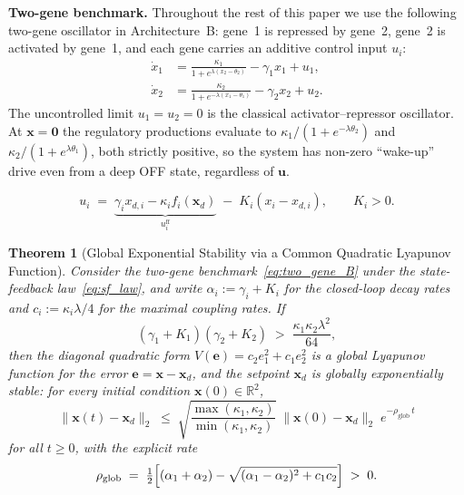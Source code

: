 \documentclass[10pt,a4paper]{amsart}
\newtheorem{theorem}{Theorem}
\begin{document}
\smallskip
\noindent\textbf{Two-gene benchmark.}\;
Throughout the rest of this paper we use the following two-gene
oscillator in Architecture~B: gene~1 is repressed by gene~2, gene~2
is activated by gene~1, and each gene carries an additive control input
$u_i$:
\begin{equation}
\boxed{
\begin{aligned}
\dot{x}_1 &= \frac{\kappa_1}{1+e^{\lambda(x_2 - \theta_2)}} - \gamma_1 x_1 + u_1,\\[2pt]
\dot{x}_2 &= \frac{\kappa_2}{1+e^{-\lambda(x_1 - \theta_1)}} - \gamma_2 x_2 + u_2.
\end{aligned}
}
\label{eq:two_gene_B}
\end{equation}
The uncontrolled limit $u_1=u_2=0$ is the classical activator--repressor
oscillator. At $\mathbf{x}=\mathbf{0}$ the regulatory productions evaluate
to $\kappa_1/(1+e^{-\lambda\theta_2})$ and $\kappa_2/(1+e^{\lambda\theta_1})$,
both strictly positive, so the system has non-zero
``wake-up'' drive even from a deep OFF state, regardless of $\mathbf{u}$.

\begin{equation}
u_i \;=\; \underbrace{\gamma_i x_{d,i} - \kappa_i f_i(\mathbf{x}_d)}_{u_i^{\mathrm{ff}}}
   \;-\; K_i (x_i - x_{d,i}),\qquad K_i>0.
\label{eq:sf_law}
\end{equation}

\begin{theorem}[Global Exponential Stability via a Common Quadratic Lyapunov Function]
\label{thm:global_sf}
Consider the two-gene benchmark~\eqref{eq:two_gene_B} under the
state-feedback law~\eqref{eq:sf_law}, and write
$\alpha_i:=\gamma_i+K_i$ for the closed-loop decay rates and
$c_i:=\kappa_i\lambda/4$ for the maximal coupling rates. If
\begin{equation}
(\gamma_1+K_1)(\gamma_2+K_2) \;>\; \frac{\kappa_1\kappa_2\lambda^2}{64},
\label{eq:global_cond}
\end{equation}
then the diagonal quadratic form $V(\mathbf{e})=c_2 e_1^2+c_1 e_2^2$ is a
global Lyapunov function for the error $\mathbf{e}=\mathbf{x}-\mathbf{x}_d$,
and the setpoint $\mathbf{x}_d$ is \emph{globally exponentially stable}:
for every initial condition $\mathbf{x}(0)\in\mathbb{R}^2$,
\begin{equation}
\|\mathbf{x}(t)-\mathbf{x}_d\|_2 \;\le\;
   \sqrt{\frac{\max(\kappa_1,\kappa_2)}{\min(\kappa_1,\kappa_2)}}\;
   \|\mathbf{x}(0)-\mathbf{x}_d\|_2\;e^{-\rho_{\mathrm{glob}}\,t}
\label{eq:global_decay}
\end{equation}
for all $t\ge 0$, with the explicit rate
\begin{equation}
\rho_{\mathrm{glob}} \;=\;
\tfrac{1}{2}\Bigl[(\alpha_1+\alpha_2)
   -\sqrt{(\alpha_1-\alpha_2)^2+c_1c_2}\Bigr] \;>\;0.
\label{eq:rho_glob}
\end{equation}
\end{theorem}
\end{document}
